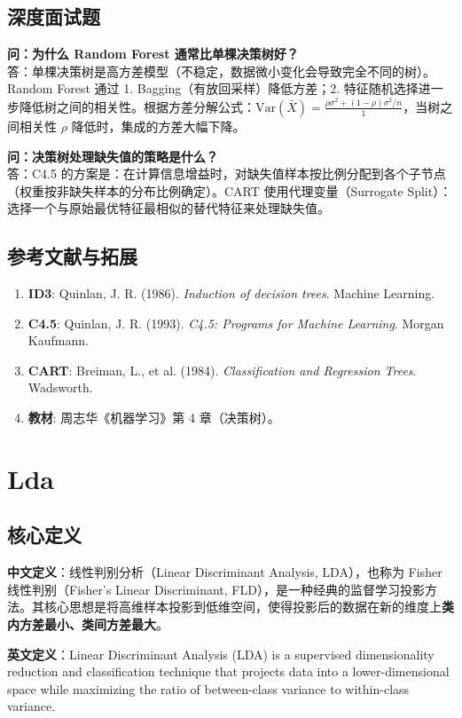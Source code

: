 \documentclass[12pt, a4paper]{book}
\begin{document}
\section{深度面试题}

\textbf{问：为什么 Random Forest 通常比单棵决策树好？}\\
答：单棵决策树是高方差模型（不稳定，数据微小变化会导致完全不同的树）。Random Forest 通过 1. Bagging（有放回采样）降低方差；2. 特征随机选择进一步降低树之间的相关性。根据方差分解公式：$\text{Var}(\bar{X}) = \frac{\rho \sigma^2 + (1-\rho)\sigma^2/n}{1}$，当树之间相关性 $\rho$ 降低时，集成的方差大幅下降。

\textbf{问：决策树处理缺失值的策略是什么？}\\
答：C4.5 的方案是：在计算信息增益时，对缺失值样本按比例分配到各个子节点（权重按非缺失样本的分布比例确定）。CART 使用代理变量（Surrogate Split）：选择一个与原始最优特征最相似的替代特征来处理缺失值。

\section{参考文献与拓展}
\begin{enumerate}
    \item \textbf{ID3}: Quinlan, J. R. (1986). \textit{Induction of decision trees}. Machine Learning.
    \item \textbf{C4.5}: Quinlan, J. R. (1993). \textit{C4.5: Programs for Machine Learning}. Morgan Kaufmann.
    \item \textbf{CART}: Breiman, L., et al. (1984). \textit{Classification and Regression Trees}. Wadsworth.
    \item \textbf{教材}: 周志华《机器学习》第 4 章（决策树）。
\end{enumerate}

\chapter{Lda}


\section{核心定义}
\textbf{中文定义}：线性判别分析（Linear Discriminant Analysis, LDA），也称为 Fisher 线性判别（Fisher's Linear Discriminant, FLD），是一种经典的监督学习投影方法。其核心思想是将高维样本投影到低维空间，使得投影后的数据在新的维度上\textbf{类内方差最小、类间方差最大}。

\textbf{英文定义}：Linear Discriminant Analysis (LDA) is a supervised dimensionality reduction and classification technique that projects data into a lower-dimensional space while maximizing the ratio of between-class variance to within-class variance.
\end{document}
